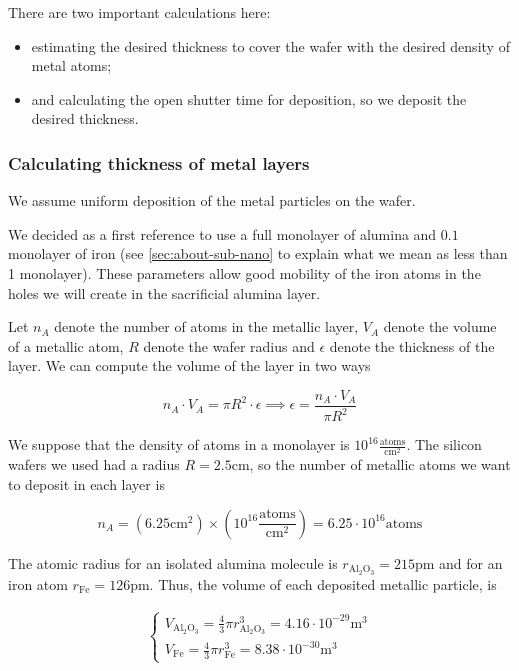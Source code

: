 \documentclass[a4paper,12pt,twoside]{article}
\begin{document}
There are two important calculations here:
\begin{itemize}
    \item estimating the desired thickness to cover the wafer with the desired density of metal atoms;
    \item and calculating the open shutter time for deposition, so we deposit the desired thickness.
\end{itemize}

\subsubsection{Calculating thickness of metal layers}

We assume uniform deposition of the metal particles on the wafer.

We decided as a first reference to use a full monolayer of alumina and $0.1$ monolayer of iron (see \ref{sec:about-sub-nano} to explain what we mean as less than 1 monolayer). These parameters allow good mobility of the iron atoms in the holes we will create in the sacrificial alumina layer.

Let $n_A$ denote the number of atoms in the metallic layer, $V_A$ denote the volume of a metallic atom, $R$ denote the wafer radius and $\epsilon$ denote the thickness of the layer. We can compute the volume of the layer in two ways

$$ n_A \cdot V_A = \pi R^2 \cdot \epsilon \implies \epsilon = \frac{n_A \cdot V_A}{\pi R^2} $$

We suppose that the density of atoms in a monolayer is $10^{16} \frac{\mathrm{atoms}}{\mathrm{cm}^2}$. The silicon wafers we used had a radius $R = 2.5\mathrm{cm}$, so the number of metallic atoms we want to deposit in each layer is

$$n_A = (6.25 \mathrm{cm^2}) \times \left(10^{16} \frac{\mathrm{atoms}}{\mathrm{cm^2}}\right) = 6.25 \cdot 10^{16} \mathrm{atoms}$$

The atomic radius for an isolated alumina molecule is $r_{\mathrm{Al_2O_3}} = 215 \mathrm{pm}$ and for an iron atom $r_{\mathrm{Fe}} = 126 \mathrm{pm}$. Thus, the volume of each deposited metallic particle, is

\begin{align}
    \begin{cases}
        V_{\mathrm{Al_2O_3}} = \frac{4}{3} \pi r_{\mathrm{Al_2O_3}}^3 = 4.16 \cdot 10^{-29} \mathrm{m}^3 \\
        V_{\mathrm{Fe}} = \frac{4}{3} \pi r_{\mathrm{Fe}}^3 = 8.38 \cdot 10^{-30} \mathrm{m}^3
    \end{cases}
\end{align}
\end{document}
